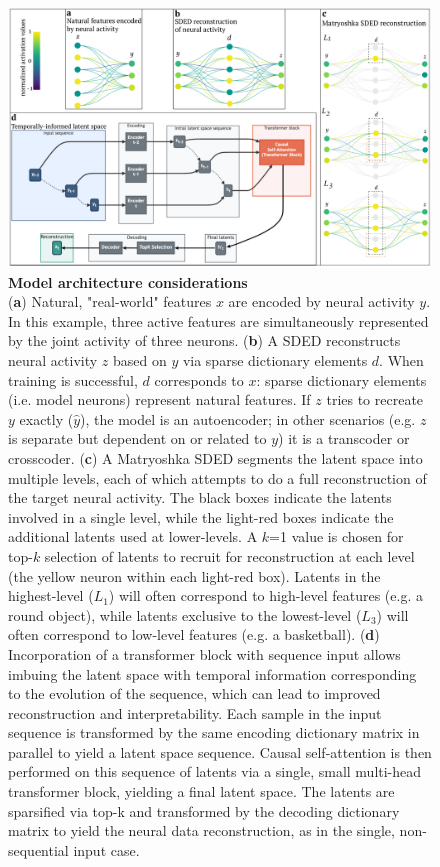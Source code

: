 \begin{figure}[tbph]
    \includegraphics[width=\linewidth]{figures/sded_arch.pdf}
    \caption{
        \textbf{Model architecture considerations} \\
        \small
        (\textbf{a}) Natural, "real-world" features $x$ are encoded by neural activity $y$. In this example, three active features are simultaneously represented by the joint activity of three neurons. (\textbf{b}) A SDED reconstructs neural activity $z$ based on $y$ via sparse dictionary elements $d$. When training is successful, $d$ corresponds to $x$: sparse dictionary elements (i.e. model neurons) represent natural features. If $z$ tries to recreate $y$ exactly ($\hat{y}$), the model is an autoencoder; in other scenarios (e.g. $z$ is separate but dependent on or related to $y$) it is a transcoder or crosscoder. (\textbf{c}) A Matryoshka SDED segments the latent space into multiple levels, each of which attempts to do a full reconstruction of the target neural activity. The black boxes indicate the latents involved in a single level, while the light-red boxes indicate the additional latents used at lower-levels. A $k$=1 value is chosen for top-$k$ selection of latents to recruit for reconstruction at each level (the yellow neuron within each light-red box). Latents in the highest-level ($L_1$) will often correspond to high-level features (e.g. a round object), while latents exclusive to the lowest-level ($L_3$) will often correspond to low-level features (e.g. a basketball). (\textbf{d}) Incorporation of a transformer block with sequence input allows imbuing the latent space with temporal information corresponding to the evolution of the sequence, which can lead to improved reconstruction and interpretability. Each sample in the input sequence is transformed by the same encoding dictionary matrix in parallel to yield a latent space sequence. Causal self-attention is then performed on this sequence of latents via a single, small multi-head transformer block, yielding a final latent space. The latents are sparsified via top-k and transformed by the decoding dictionary matrix to yield the neural data reconstruction, as in the single, non-sequential input case. 
    }
    \label{figure:sded_arch}
\end{figure}

